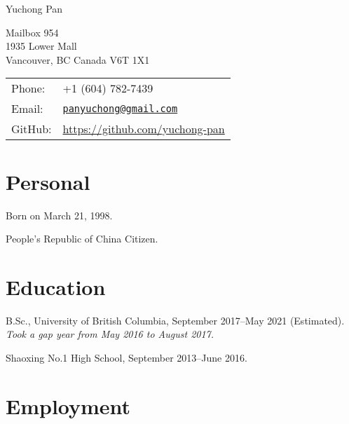\documentclass[letterpaper]{article}
\def\name{Yuchong Pan}
\renewenvironment{itemize}{
  \begin{list}{}{
    \setlength{\leftmargin}{1.5em}
  }
}{
  \end{list}
}
\begin{document}
{\huge \name}


\vspace{0.25in}

\begin{minipage}{0.45\linewidth}
  Mailbox 954 \\
  1935 Lower Mall \\
  Vancouver, BC Canada V6T 1X1
\end{minipage}
\begin{minipage}{0.45\linewidth}
  \begin{tabular}{ll}
    Phone: & +1 (604) 782-7439 \\
    Email: & \href{mailto:panyuchong@gmail.com}{\tt panyuchong@gmail.com} \\
    GitHub: & \url{https://github.com/yuchong-pan}
  \end{tabular}
\end{minipage}


\section*{Personal}

\begin{itemize}
    \item Born on March 21, 1998.

    \item People's Republic of China Citizen.
\end{itemize}


\section*{Education}

\begin{itemize}
  \item B.Sc., University of British Columbia, September 2017--May 2021 (Estimated).\\
  \emph{Took a gap year from May 2016 to August 2017.}

  \item Shaoxing No.1 High School, September 2013--June 2016.
\end{itemize}


\section*{Employment}
\end{document}
